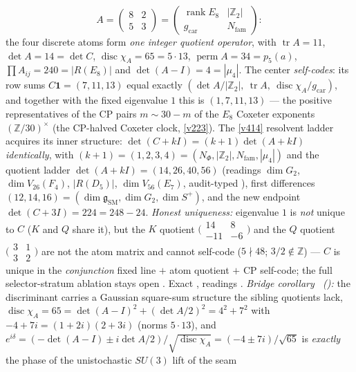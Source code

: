 \documentclass[11pt,a4paper]{article}
\newcommand{\gcar}{g_{\mathrm{car}}}
\newcommand{\Nfam}{N_{\mathrm{fam}}}
\newcommand{\Z}{\mathbb{Z}}
\theoremstyle{definition}
\begin{document}
\begin{keybox}
\[
  A=\begin{pmatrix}8&2\\5&3\end{pmatrix}
   =\begin{pmatrix}\operatorname{rank}E_8&|\Z_2|\\ \gcar&\Nfam\end{pmatrix}:
\]
the four discrete atoms form \emph{one integer quotient operator}, with
$\operatorname{tr}A=11$, $\det A=14=\det C$, $\operatorname{disc}\chi_A=65=5\cdot13$,
$\operatorname{perm}A=34=p_5(a)$, $\prod A_{ij}=240=|R(E_8)|$ and $\det(A{-}I)=4=|\mu_4|$. The center
\emph{self-codes}: its row sums $C\mathbf 1=(7,11,13)$ equal exactly
$(\det A/|\Z_2|,\ \operatorname{tr}A,\ \operatorname{disc}\chi_A/\gcar)$, and together with the fixed
eigenvalue $1$ this is $(1,7,11,13)$ --- the positive representatives of the CP pairs $m\sim30{-}m$ of the
$E_8$ Coxeter exponents $(\Z/30)^\times$ (the CP-halved Coxeter clock, \vref{v223}). The \vref{v414}
resolvent ladder acquires its inner structure: $\det(C{+}kI)=(k{+}1)\det(A{+}kI)$ \emph{identically}, with
$(k{+}1)=(1,2,3,4)=(N_\Phi,|\Z_2|,\Nfam,|\mu_4|)$ and the quotient ladder
$\det(A{+}kI)=(14,26,40,56)$ (readings $\dim G_2$, $\dim V_{26}(F_4)$, $|R(D_5)|$, $\dim V_{56}(E_7)$,
audit-typed \mC), first differences $(12,14,16)=(\dim\mathfrak g_{\mathrm{SM}},\dim G_2,\dim S^+)$, and the
new endpoint $\det(C{+}3I)=224=248-24$. \emph{Honest uniqueness:} eigenvalue $1$ is \emph{not} unique to
$C$ ($K$ and $Q$ share it), but the $K$ quotient
$\big(\begin{smallmatrix}14&8\\-11&-6\end{smallmatrix}\big)$ and the $Q$ quotient
$\big(\begin{smallmatrix}3&1\\3&2\end{smallmatrix}\big)$ are not the atom matrix and cannot self-code
($5\nmid48$; $3/2\notin\Z$) --- $C$ is unique in the \emph{conjunction} fixed line $+$ atom quotient $+$
CP self-code; the full selector-stratum ablation stays open \mO. Exact \mE, readings \mC.
\emph{Bridge corollary \mE\ ():} the discriminant carries a
Gaussian square-sum structure the sibling quotients lack,
$\operatorname{disc}\chi_A=65=\det(A{-}I)^2+(\det A/2)^2=4^2+7^2$ with $-4+7i=(1{+}2i)(2{+}3i)$
(norms $5\cdot13$), and $e^{i\delta}=(-\det(A{-}I)\pm i\det A/2)/\sqrt{\operatorname{disc}\chi_A}
=(-4\pm7i)/\sqrt{65}$ is \emph{exactly} the phase of the unistochastic $SU(3)$ lift of the seam

\end{keybox}
\end{document}
